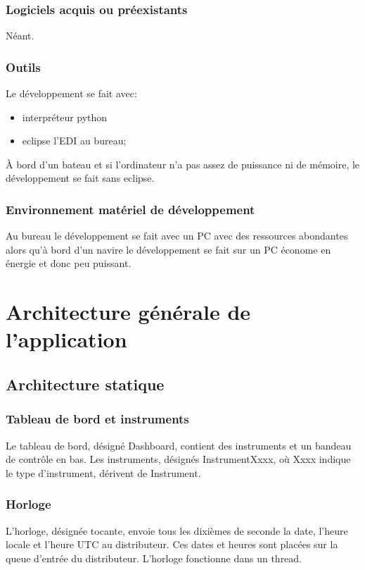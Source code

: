 \documentclass[a4paper,11pt]{report}
\begin{document}
\subsection{Logiciels acquis ou préexistants}
Néant.
\subsection{Outils}
Le développement se fait avec:
\begin{itemize}
	\item interpréteur python
	\item eclipse l'EDI au bureau;
\end{itemize}
À bord d'un bateau et si l'ordinateur n'a pas assez de puissance ni de mémoire,
le développement se fait sans eclipse.

\subsection{Environnement matériel de développement}
Au bureau le développement se fait avec un PC avec des ressources abondantes alors 
qu'à bord d'un navire le développement se fait sur un PC économe en énergie et donc
peu puissant.
\chapter{Architecture générale de l'application}
\section{Architecture statique}

\subsection{Tableau de bord et instruments}

Le tableau de bord, désigné Dashboard, contient des instruments
et un bandeau de contrôle en bas.
Les instruments, désignés InstrumentXxxx, où Xxxx indique le type d'instrument,
dérivent de Instrument.


\subsection{Horloge}
L'horloge, désignée tocante, envoie tous les dixièmes de seconde
la date, l'heure locale et l'heure UTC au distributeur. Ces dates et heures
sont placées sur la queue d'entrée du distributeur.
L'horloge fonctionne dans un thread.
\end{document}
